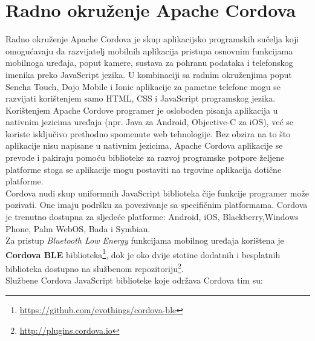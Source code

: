 \chapter{Radno okruženje Apache Cordova}
\label{chap:radnoOkruzenje}

Radno okruženje Apache Cordova je skup aplikacijsko programskih sučelja  koji omogućavaju da razvijatelj mobilnih aplikacija pristupa osnovnim funkcijama mobilnoga uređaja, poput kamere, sustava za pohranu podataka i telefonskog imenika preko JavaScript jezika. 
U kombinaciji sa radnim okruženjima poput Sencha Touch, Dojo Mobile i Ionic aplikacije za pametne telefone mogu se razvijati korištenjem samo HTML, CSS i JavaScript programskog jezika.
\\

Korištenjem Apache Cordove programer je oslobođen pisanja aplikacija u nativnim jezicima uređaja (npr. Java za Android, Objective-C za iOS), već se koriste isključivo prethodno spomenute web tehnologije. 
Bez obzira na to što aplikacije nisu napisane u nativnim jezicima, Apache Cordova aplikacije se prevode i pakiraju pomoću biblioteke za razvoj programske potpore  željene platforme stoga se aplikacije mogu postaviti na trgovine aplikacija  dotične platforme. 
\\

Cordova nudi skup uniformnih JavaScript biblioteka čije funkcije programer može pozivati. 
One imaju podršku za povezivanje sa specifičnim platformama. Cordova je trenutno dostupna za sljedeće platforme: Android, iOS, Blackberry,Windows Phone, Palm WebOS, Bada i Symbian.
\\

Za pristup \textit{Bluetooth Low Energy} funkcijama mobilnog uređaja korištena je \textbf{Cordova BLE} biblioteka\footnote{\url{https://github.com/evothings/cordova-ble}}, dok je oko dvije stotine dodatnih i besplatnih biblioteka dostupno na službenom repozitoriju\footnote{\url{http://plugins.cordova.io}}.
\\
Službene Cordova JavaScript biblioteke koje održava Cordova tim su:


